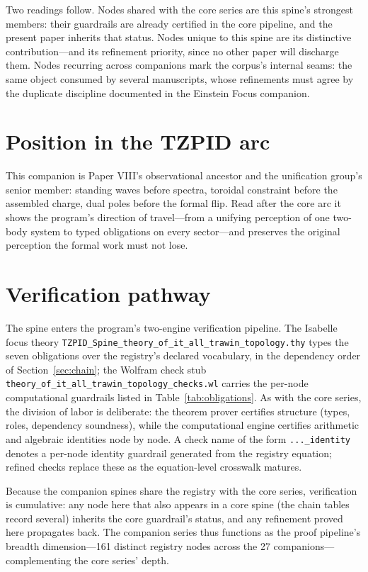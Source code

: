 \documentclass[11pt]{article}
\theoremstyle{remark}
\begin{document}
Two readings follow. Nodes shared with the core series are this spine's strongest members: their guardrails are already certified in the core pipeline, and the present paper inherits that status. Nodes unique to this spine are its distinctive contribution---and its refinement priority, since no other paper will discharge them. Nodes recurring across companions mark the corpus's internal seams: the same object consumed by several manuscripts, whose refinements must agree by the duplicate discipline documented in the Einstein Focus companion.

\section{Position in the TZPID arc}
\label{sec:arc}

This companion is Paper VIII's observational ancestor and the unification group's senior member: standing waves before spectra, toroidal constraint before the assembled charge, dual poles before the formal flip. Read after the core arc it shows the program's direction of travel---from a unifying perception of one two-body system to typed obligations on every sector---and preserves the original perception the formal work must not lose.

\section{Verification pathway}
\label{sec:verify}

The spine enters the program's two-engine verification pipeline. The Isabelle focus theory \texttt{TZPID\_Spine\_theory\_of\_it\_all\_trawin\_topology.thy} types the seven obligations over the registry's declared vocabulary, in the dependency order of Section~\ref{sec:chain}; the Wolfram check stub \texttt{theory\_of\_it\_all\_trawin\_topology\_checks.wl} carries the per-node computational guardrails listed in Table~\ref{tab:obligations}. As with the core series, the division of labor is deliberate: the theorem prover certifies structure (types, roles, dependency soundness), while the computational engine certifies arithmetic and algebraic identities node by node. A check name of the form \texttt{...\_identity} denotes a per-node identity guardrail generated from the registry equation; refined checks replace these as the equation-level crosswalk matures.

Because the companion spines share the registry with the core series, verification is cumulative: any node here that also appears in a core spine (the chain tables record several) inherits the core guardrail's status, and any refinement proved here propagates back. The companion series thus functions as the proof pipeline's breadth dimension---161 distinct registry nodes across the 27 companions---complementing the core series' depth.
\end{document}
